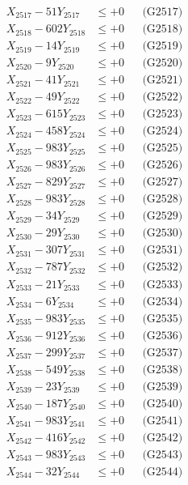 \documentclass[a4paper,10pt]{article}
\begin{document}
{\begin{align}
X_{2517} - 51Y_{2517} &\leq +0 && \text{(G2517)} \\
X_{2518} - 602Y_{2518} &\leq +0 && \text{(G2518)} \\
X_{2519} - 14Y_{2519} &\leq +0 && \text{(G2519)} \\
X_{2520} - 9Y_{2520} &\leq +0 && \text{(G2520)} \\
\allowbreak
X_{2521} - 41Y_{2521} &\leq +0 && \text{(G2521)} \\
X_{2522} - 49Y_{2522} &\leq +0 && \text{(G2522)} \\
X_{2523} - 615Y_{2523} &\leq +0 && \text{(G2523)} \\
X_{2524} - 458Y_{2524} &\leq +0 && \text{(G2524)} \\
X_{2525} - 983Y_{2525} &\leq +0 && \text{(G2525)} \\
X_{2526} - 983Y_{2526} &\leq +0 && \text{(G2526)} \\
X_{2527} - 829Y_{2527} &\leq +0 && \text{(G2527)} \\
X_{2528} - 983Y_{2528} &\leq +0 && \text{(G2528)} \\
X_{2529} - 34Y_{2529} &\leq +0 && \text{(G2529)} \\
X_{2530} - 29Y_{2530} &\leq +0 && \text{(G2530)} \\
\allowbreak
X_{2531} - 307Y_{2531} &\leq +0 && \text{(G2531)} \\
X_{2532} - 787Y_{2532} &\leq +0 && \text{(G2532)} \\
X_{2533} - 21Y_{2533} &\leq +0 && \text{(G2533)} \\
X_{2534} - 6Y_{2534} &\leq +0 && \text{(G2534)} \\
X_{2535} - 983Y_{2535} &\leq +0 && \text{(G2535)} \\
X_{2536} - 912Y_{2536} &\leq +0 && \text{(G2536)} \\
X_{2537} - 299Y_{2537} &\leq +0 && \text{(G2537)} \\
X_{2538} - 549Y_{2538} &\leq +0 && \text{(G2538)} \\
X_{2539} - 23Y_{2539} &\leq +0 && \text{(G2539)} \\
X_{2540} - 187Y_{2540} &\leq +0 && \text{(G2540)} \\
\allowbreak
X_{2541} - 983Y_{2541} &\leq +0 && \text{(G2541)} \\
X_{2542} - 416Y_{2542} &\leq +0 && \text{(G2542)} \\
X_{2543} - 983Y_{2543} &\leq +0 && \text{(G2543)} \\
X_{2544} - 32Y_{2544} &\leq +0 && \text{(G2544)} \\

\end{align}}
\end{document}
